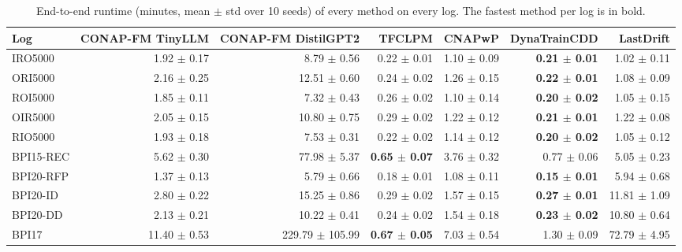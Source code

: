 \begin{table}[t]
\centering
\footnotesize
\setlength{\tabcolsep}{4pt}
\caption{End-to-end runtime (minutes, mean $\pm$ std over 10 seeds) of every method on every log. The fastest method per log is in bold.}
\label{tab:runtime_full}
\begin{tabular}{lrrrrrr}
\toprule
Log & CONAP-FM TinyLLM & CONAP-FM DistilGPT2 & TFCLPM & CNAPwP & DynaTrainCDD & LastDrift \\
\midrule
IRO5000 & 1.92 $\pm$ 0.17 & 8.79 $\pm$ 0.56 & 0.22 $\pm$ 0.01 & 1.10 $\pm$ 0.09 & \textbf{0.21 $\pm$ 0.01} & 1.02 $\pm$ 0.11 \\
ORI5000 & 2.16 $\pm$ 0.25 & 12.51 $\pm$ 0.60 & 0.24 $\pm$ 0.02 & 1.26 $\pm$ 0.15 & \textbf{0.22 $\pm$ 0.01} & 1.08 $\pm$ 0.09 \\
ROI5000 & 1.85 $\pm$ 0.11 & 7.32 $\pm$ 0.43 & 0.26 $\pm$ 0.02 & 1.10 $\pm$ 0.14 & \textbf{0.20 $\pm$ 0.02} & 1.05 $\pm$ 0.15 \\
OIR5000 & 2.05 $\pm$ 0.15 & 10.80 $\pm$ 0.75 & 0.29 $\pm$ 0.02 & 1.22 $\pm$ 0.12 & \textbf{0.21 $\pm$ 0.01} & 1.22 $\pm$ 0.08 \\
RIO5000 & 1.93 $\pm$ 0.18 & 7.53 $\pm$ 0.31 & 0.22 $\pm$ 0.02 & 1.14 $\pm$ 0.12 & \textbf{0.20 $\pm$ 0.02} & 1.05 $\pm$ 0.12 \\
BPI15-REC & 5.62 $\pm$ 0.30 & 77.98 $\pm$ 5.37 & \textbf{0.65 $\pm$ 0.07} & 3.76 $\pm$ 0.32 & 0.77 $\pm$ 0.06 & 5.05 $\pm$ 0.23 \\
BPI20-RFP & 1.37 $\pm$ 0.13 & 5.79 $\pm$ 0.66 & 0.18 $\pm$ 0.01 & 1.08 $\pm$ 0.11 & \textbf{0.15 $\pm$ 0.01} & 5.94 $\pm$ 0.68 \\
BPI20-ID & 2.80 $\pm$ 0.22 & 15.25 $\pm$ 0.86 & 0.29 $\pm$ 0.02 & 1.57 $\pm$ 0.15 & \textbf{0.27 $\pm$ 0.01} & 11.81 $\pm$ 1.09 \\
BPI20-DD & 2.13 $\pm$ 0.21 & 10.22 $\pm$ 0.41 & 0.24 $\pm$ 0.02 & 1.54 $\pm$ 0.18 & \textbf{0.23 $\pm$ 0.02} & 10.80 $\pm$ 0.64 \\
BPI17 & 11.40 $\pm$ 0.53 & 229.79 $\pm$ 105.99 & \textbf{0.67 $\pm$ 0.05} & 7.03 $\pm$ 0.54 & 1.30 $\pm$ 0.09 & 72.79 $\pm$ 4.95 \\
\bottomrule
\end{tabular}
\end{table}
